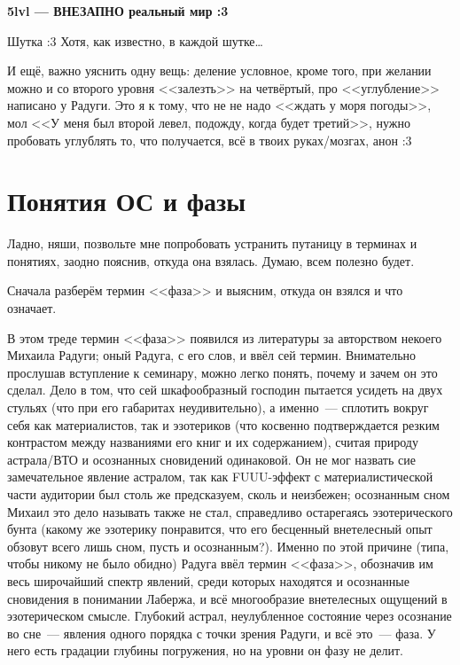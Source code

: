 \documentclass[a5paper,12pt,twoside]{memoir}
\begin{document}
\begin{center}
\textbf{5lvl — ВНЕЗАПНО реальный мир :3}
\end{center}

Шутка :3 Хотя, как известно, в каждой шутке\ldots
\medskip

И ещё, важно уяснить одну вещь: деление условное, кроме того, при желании можно и со второго  уровня <<залезть>> на четвёртый, про <<углубление>> написано у Радуги. Это я к тому, что не не надо <<ждать у моря погоды>>, мол <<У меня был второй левел, подожду, когда будет третий>>, нужно пробовать углублять то, что получается, всё в твоих руках/мозгах, анон :3



\section{Понятия ОС и фазы}


Ладно, няши, позвольте мне попробовать устранить путаницу в терминах и понятиях, заодно пояснив, откуда она взялась. Думаю, всем полезно будет. 

Сначала разберём термин <<фаза>> и выясним, откуда он взялся и что означает.

В этом треде термин <<фаза>> появился из литературы за авторством некоего Михаила Радуги; оный Радуга, с его слов, и ввёл сей термин. Внимательно прослушав вступление к семинару, можно легко понять, почему и зачем он это сделал. Дело в том, что сей шкафообразный господин пытается усидеть на двух стульях (что при его габаритах неудивительно), а именно~--- сплотить вокруг себя как материалистов, так и эзотериков (что косвенно подтверждается резким контрастом между названиями его книг и их содержанием), считая природу астрала/ВТО и осознанных сновидений одинаковой. Он не мог назвать сие замечательное явление астралом, так как FUUU-эффект с материалистической части аудитории был столь же предсказуем, сколь и неизбежен; осознанным сном Михаил это дело называть также не стал, справедливо остарегаясь эзотерического бунта (какому же эзотерику понравится, что его бесценный внетелесный опыт обзовут всего лишь сном, пусть и осознанным?). Именно по этой причине (типа, чтобы никому не было обидно) Радуга ввёл термин <<фаза>>, обозначив им весь широчайший спектр явлений, среди которых находятся и осознанные сновидения в понимании Лабержа, и всё многообразие внетелесных ощущений в эзотерическом смысле. Глубокий астрал, неулубленное состояние через осознание во сне~--- явления одного порядка с точки зрения Радуги, и всё это~--- фаза. У него есть градации глубины погружения, но на уровни он фазу не делит.
\end{document}
